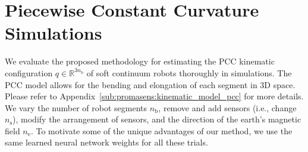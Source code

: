 \section{Piecewise Constant Curvature Simulations}\label{sec:promasens:pcc_simulations}
We evaluate the proposed methodology for estimating the \gls{PCC} kinematic configuration $q \in \mathbb{R}^{3n_\mathrm{b}}$ of soft continuum robots thoroughly in simulations.
The PCC model allows for the bending and elongation of each segment in 3D space. Please refer to Appendix~\ref{sub:promasens:kinematic_model_pcc} for more details.
We vary the number of robot segments $n_\mathrm{b}$, remove and add sensors (i.e., change $n_\mathrm{s}$), modify the arrangement of sensors, and the direction of the earth's magnetic field $n_\mathrm{e}$. 
To motivate some of the unique advantages of our method, we use the same learned neural network weights for all these trials.


